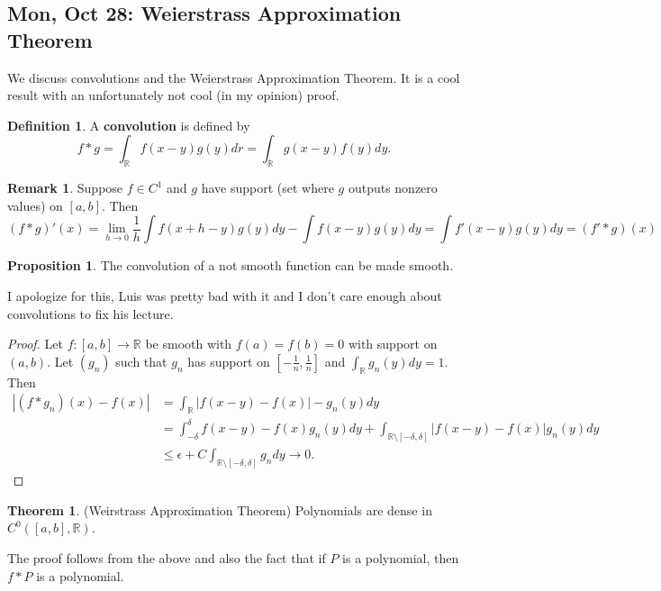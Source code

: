 \documentclass[10pt, oneside]{article}
\newcommand{\bbR}{\mathbb{R}}
\theoremstyle{definition}
\newtheorem{thm}{Theorem}
\newtheorem{defn}{Definition}
\newtheorem{prop}{Proposition}
\newtheorem{rem}{Remark}
\begin{document}
\subsection{Mon, Oct 28: Weierstrass Approximation Theorem}
We discuss convolutions and the Weierstrass Approximation Theorem. It is a cool result with an unfortunately not cool (in my opinion) proof.
\begin{defn}
    A \textbf{convolution} is defined by \[f \ast g = \int_\bbR f(x-y)g(y)dr = \int_\bbR g(x-y)f(y)dy.\]
\end{defn}
\begin{rem}
    Suppose $f \in C^1$ and $g$ have support (set where $g$ outputs nonzero values) on $[a,b].$ Then \[(f\ast g)'(x) = \lim_{h\to 0}\frac{1}{h}\int f(x + h -y)g(y)dy - \int f(x-y)g(y)dy = \int f'(x-y)g(y)dy = (f' \ast g)(x)\]
\end{rem}
\begin{prop}
    The convolution of a not smooth function can be made smooth.
\end{prop}
I apologize for this, Luis was pretty bad with it and I don't care enough about convolutions to fix his lecture.
\begin{proof}
    Let $f: [a,b]\to \bbR$ be smooth with $f(a) = f(b) = 0$ with support on $(a,b).$ Let $(g_n)$ such that $g_n$ has support on $[-\frac{1}{n}, \frac{1}{n}]$ and $\int_\bbR g_n(y)dy = 1.$ Then 
    \begin{align*}
        |(f\ast g_n)(x) - f(x)| &= \int_\bbR |f(x-y) - f(x)| - g_n(y)dy\\
        &= \int_{-\delta}^\delta f(x-y) - f(x)g_n(y)dy + \int_{\bbR \setminus [-\delta, \delta]}|f(x-y) - f(x)| g_n(y)dy\\
        &\leq \epsilon + C\int_{\bbR \setminus [-\delta, \delta]} g_n dy \to 0.
    \end{align*}
\end{proof}
\begin{thm}
    (Weirstrass Approximation Theorem) Polynomials are dense in $C^0([a,b], \bbR).$ 
\end{thm}
The proof follows from the above and also the fact that if $P$ is a polynomial, then $f \ast P$ is a polynomial.

\newpage
\end{document}

